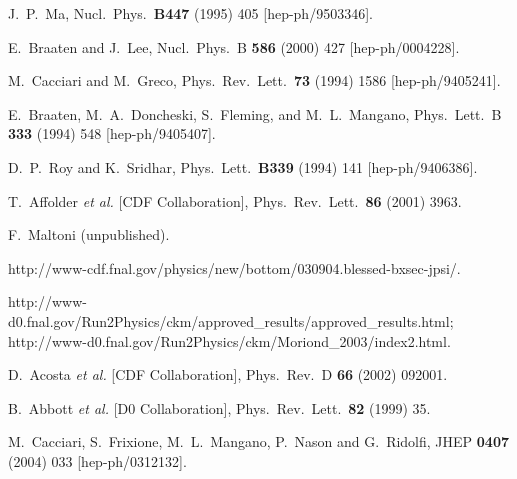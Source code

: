 \begin{thebibliography}{999}
J.~P.~Ma,
Nucl.\ Phys.\ {\bf B447} (1995) 405
[hep-ph/9503346].

E.~Braaten and J.~Lee,
Nucl.\ Phys.\ B {\bf 586} (2000) 427 
[hep-ph/0004228].

M.~Cacciari and M.~Greco,
Phys.\ Rev.\ Lett.\  {\bf 73} (1994) 1586
[hep-ph/9405241].

E.~Braaten, M.~A.~Doncheski, S.~Fleming, and M.~L.~Mangano,
Phys.\ Lett.\ B {\bf 333} (1994) 548
[hep-ph/9405407].

D.~P.~Roy and K.~Sridhar,
Phys.\ Lett.\  {\bf B339} (1994) 141
[hep-ph/9406386].

T.~Affolder {\it et al.}  [CDF Collaboration],
Phys.\ Rev.\ Lett.\  {\bf 86} (2001) 3963.

F.~Maltoni (unpublished).

http://www-cdf.fnal.gov/physics/new/bottom/030904.blessed-bxsec-jpsi/.

http://www-d0.fnal.gov/Run2Physics/ckm/approved\_results/approved\_results.html;
http://www-d0.fnal.gov/Run2Physics/ckm/Moriond\_2003/index2.html.

D.~Acosta  {\it et al.}  [CDF Collaboration],
Phys.\ Rev.\ D {\bf 66} (2002) 092001.

B.~Abbott  {\it et al.}  [D0 Collaboration],
Phys.\ Rev.\ Lett.\  {\bf 82} (1999) 35.

M.~Cacciari, S.~Frixione, M.~L.~Mangano, P.~Nason and G.~Ridolfi,
JHEP {\bf 0407} (2004) 033
[hep-ph/0312132].


\end{thebibliography}
